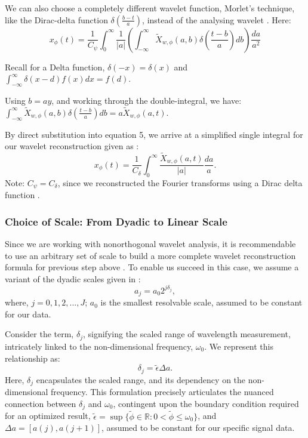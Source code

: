 \documentclass{article}
\begin{document}
We can also choose a completely different wavelet function, Morlet's technique, like the Dirac-delta function $\delta\left(\frac{b-t}{a}\right)$, instead of the analysing wavelet \cite{doi:10.1146/annurev.fl.24.010192.002143}\cite{Roy_2022}. Here: 
\begin{equation}
    x_{\phi}(t) = \frac{1}{C_{\psi}} \int_{0}^{\infty}\frac{1}{|a|} \left(\int_{-\infty}^{\infty} \tilde{X}_{w,\phi}(a,b)\delta\left(\frac{t-b}{a}\right)db\right)\frac{da}{a^2}
\end{equation}


Recall for a Delta function, $\delta(-x)=\delta(x)$ and $\int_{-\infty}^{\infty}\delta(x-d)f(x) dx=f(d)$.

Using $b=ay$, and working through the double-integral, we have: $\int_{-\infty}^{\infty} \tilde{X}_{w,\phi}(a,b)\delta\left(\frac{t-b}{a}\right)db = a\tilde{X}_{w,\phi}(a,t)$.

By direct substitution into equation 5, we arrive at a simplified single integral for our wavelet reconstruction given as \cite{doi:10.1146/annurev.fl.24.010192.002143}\cite{Roy_2022}\cite{APracticalGuidetoWaveletAnalysis}:
\begin{equation}
     x_{\phi}(t) = \frac{1}{C_{\delta}} \int_{0}^{\infty}\frac{\tilde{X}_{w,\phi}(a,t)}{|a|}\frac{da}{a}.
\end{equation}
Note: $C_{\psi}=C_{\delta}$, since we reconstructed the Fourier transforms using a Dirac delta function \cite{APracticalGuidetoWaveletAnalysis}.

\subsubsection{Choice of Scale: From Dyadic to Linear Scale}
Since we are working with nonorthogonal wavelet analysis, it is recommendable to use an arbitrary set of scale to build a more complete wavelet reconstruction formula for previous step above \cite{APracticalGuidetoWaveletAnalysis}. To enable us succeed in this case, we assume a variant of the dyadic scales given in \cite{pereyra2012harmonic}\cite{APracticalGuidetoWaveletAnalysis}: 
\begin{equation}
    a_{j} =a_{0}2^{j\delta_{j}},
\end{equation}
where, $j=0,1,2,...,J$; $a_{0}$ is the smallest resolvable scale, assumed to be constant for our data. 

Consider the term, $\delta_{j}$, signifying the scaled range of wavelength measurement, intricately linked to the non-dimensional frequency, $\omega_{0}$. We represent this relationship as: 
\begin{equation}
    \delta_{j} = \tilde{\epsilon}\Delta{a}.
\end{equation}
Here, $\delta_{j}$ encapsulates the scaled range, and its dependency on the non-dimensional frequency. This formulation precisely articulates the nuanced connection between $\delta_{j}$ and $\omega_{0}$, contingent upon the boundary condition required for an optimized result, $\tilde{\epsilon} = \sup\{\tilde{\phi} \in \mathbb{R}: 0 < \tilde{\phi} \leq \omega_0\}$, and $\Delta{a}=[a(j),a(j+1)]$, assumed to be constant for our specific signal data. 
\end{document}
